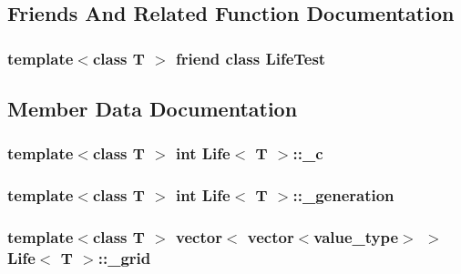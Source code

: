 \subsection{Friends And Related Function Documentation}
\hypertarget{classLife_ac09a12090bbd959da33d05c9c8bfa744}{
\subsubsection[{Life\-Test}]{\setlength{\rightskip}{0pt plus 5cm}template$<$class T $>$ friend class Life\-Test\hspace{0.3cm}{\ttfamily [friend]}}}\label{classLife_ac09a12090bbd959da33d05c9c8bfa744}


\subsection{Member Data Documentation}
\hypertarget{classLife_ae3c3c50dc1a50876bfd29a3a7718f71d}{
\subsubsection[{\-\_\-c}]{\setlength{\rightskip}{0pt plus 5cm}template$<$class T $>$ int {\bf Life}$<$ T $>$\-::\-\_\-c\hspace{0.3cm}{\ttfamily [private]}}}\label{classLife_ae3c3c50dc1a50876bfd29a3a7718f71d}
\hypertarget{classLife_a0f0c9edeadd6b61c2265baebe7df18af}{
\subsubsection[{\-\_\-generation}]{\setlength{\rightskip}{0pt plus 5cm}template$<$class T $>$ int {\bf Life}$<$ T $>$\-::\-\_\-generation\hspace{0.3cm}{\ttfamily [private]}}}\label{classLife_a0f0c9edeadd6b61c2265baebe7df18af}
\hypertarget{classLife_ab5d60edbdbea13736cfca6c82ec8195c}{
\subsubsection[{\-\_\-grid}]{\setlength{\rightskip}{0pt plus 5cm}template$<$class T $>$ vector$<$ vector$<${\bf value\-\_\-type}$>$ $>$ {\bf Life}$<$ T $>$\-::\-\_\-grid\hspace{0.3cm}{\ttfamily [private]}}}\label{classLife_ab5d60edbdbea13736cfca6c82ec8195c}
